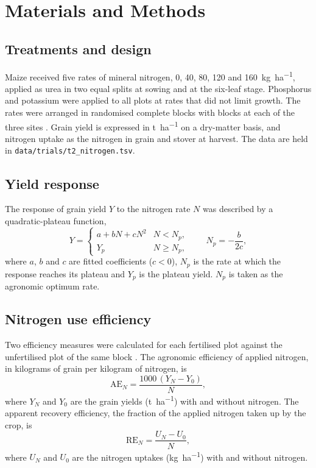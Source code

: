\section{Materials and Methods}

\subsection{Treatments and design}
Maize received five rates of mineral nitrogen, 0, 40, 80, 120 and
\SI{160}{\kilo\gram\per\hectare}, applied as urea in two equal splits at
sowing and at the six-leaf stage. Phosphorus and potassium were applied to all
plots at rates that did not limit growth. The rates were arranged in
randomised complete blocks with  blocks at each of the three sites
\parencite{gomez1984}. Grain yield is expressed in \si{\tonne\per\hectare} on a
dry-matter basis, and nitrogen uptake as the nitrogen in grain and stover at
harvest. The data are held in \texttt{data/trials/t2\_nitrogen.tsv}.

\subsection{Yield response}
The response of grain yield $Y$ to the nitrogen rate $N$ was described by a
quadratic-plateau function,
\begin{equation}
  Y =
  \begin{cases}
    a + bN + cN^2 & N < N_p,\\
    Y_p & N \ge N_p,
  \end{cases}
  \qquad N_p = -\frac{b}{2c},
  \label{eq:quadplateau}
\end{equation}
where $a$, $b$ and $c$ are fitted coefficients ($c < 0$), $N_p$ is the rate at
which the response reaches its plateau and $Y_p$ is the plateau yield. $N_p$ is
taken as the agronomic optimum rate.

\subsection{Nitrogen use efficiency}
Two efficiency measures were calculated for each fertilised plot against the
unfertilised plot of the same block \parencite{cassman2002,ladha2005}. The
agronomic efficiency of applied nitrogen, in kilograms of grain per kilogram of
nitrogen, is
\begin{equation}
  \mathrm{AE}_N = \frac{1000\,(Y_N - Y_0)}{N},
  \label{eq:ae}
\end{equation}
where $Y_N$ and $Y_0$ are the grain yields (\si{\tonne\per\hectare}) with and
without nitrogen. The apparent recovery efficiency, the fraction of the applied
nitrogen taken up by the crop, is
\begin{equation}
  \mathrm{RE}_N = \frac{U_N - U_0}{N},
  \label{eq:re}
\end{equation}
where $U_N$ and $U_0$ are the nitrogen uptakes (\si{\kilo\gram\per\hectare})
with and without nitrogen.
